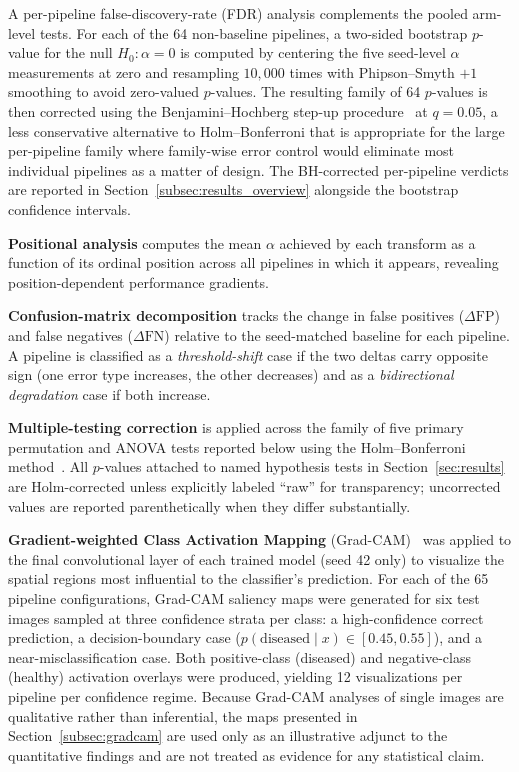 \documentclass[preprint,5p,times,twocolumn]{elsarticle}
\begin{document}
A per-pipeline false-discovery-rate (FDR) analysis complements the pooled arm-level tests. For each of the 64 non-baseline pipelines, a two-sided bootstrap $p$-value for the null $H_0: \alpha = 0$ is computed by centering the five seed-level $\alpha$ measurements at zero and resampling $10{,}000$ times with Phipson--Smyth $+1$ smoothing to avoid zero-valued $p$-values. The resulting family of 64 $p$-values is then corrected using the Benjamini--Hochberg step-up procedure~\cite{BenjaminiHochberg1995} at $q = 0.05$, a less conservative alternative to Holm--Bonferroni that is appropriate for the large per-pipeline family where family-wise error control would eliminate most individual pipelines as a matter of design. The BH-corrected per-pipeline verdicts are reported in Section~\ref{subsec:results_overview} alongside the bootstrap confidence intervals.

\textbf{Positional analysis} computes the mean $\alpha$ achieved by each transform as a function of its ordinal position across all pipelines in which it appears, revealing position-dependent performance gradients.

\textbf{Confusion-matrix decomposition} tracks the change in false positives ($\Delta\text{FP}$) and false negatives ($\Delta\text{FN}$) relative to the seed-matched baseline for each pipeline. A pipeline is classified as a \emph{threshold-shift} case if the two deltas carry opposite sign (one error type increases, the other decreases) and as a \emph{bidirectional degradation} case if both increase.

\textbf{Multiple-testing correction} is applied across the family of five primary permutation and ANOVA tests reported below using the Holm--Bonferroni method~\cite{Holm1979}. All $p$-values attached to named hypothesis tests in Section~\ref{sec:results} are Holm-corrected unless explicitly labeled ``raw'' for transparency; uncorrected values are reported parenthetically when they differ substantially.

\textbf{Gradient-weighted Class Activation Mapping} (Grad-CAM)~\cite{8237336} was applied to the final convolutional layer of each trained model (seed 42 only) to visualize the spatial regions most influential to the classifier's prediction. For each of the 65 pipeline configurations, Grad-CAM saliency maps were generated for six test images sampled at three confidence strata per class: a high-confidence correct prediction, a decision-boundary case ($p(\text{diseased} \mid x) \in [0.45, 0.55]$), and a near-misclassification case. Both positive-class (diseased) and negative-class (healthy) activation overlays were produced, yielding 12 visualizations per pipeline per confidence regime. Because Grad-CAM analyses of single images are qualitative rather than inferential, the maps presented in Section~\ref{subsec:gradcam} are used only as an illustrative adjunct to the quantitative findings and are not treated as evidence for any statistical claim.
\end{document}
